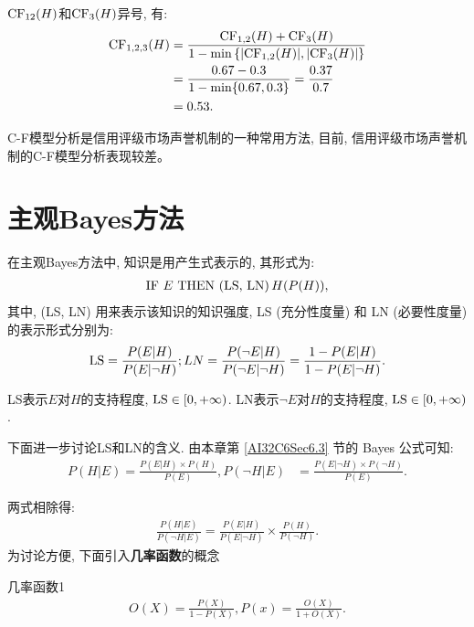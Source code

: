 $\textup{CF}_{12}(H)$和$\textup{CF}_3(H)$异号, 有:
\begin{align}
  \begin{aligned}
  \textup{CF}_{1,2,3}(H) &=\frac{\textup{CF}_{1,2}(H)+\textup{CF}_{3}(H)}{1-\min \left\{| \textup{CF}_{1,2}(H)|,| \textup{CF}_{3}(H)|\right\}} \\
                 &=\frac{0.67-0.3}{1-\min\{0.67,0.3\}}=\frac{0.37}{0.7} \\
                 &=0.53.
  \end{aligned}
\end{align}

\begin{remark}
    C-F模型分析是信用评级市场声誉机制的一种常用方法, 目前, 信用评级市场声誉机制的C-F模型分析表现较差。
\end{remark}
\section{主观Bayes方法}
在主观Bayes方法中, 知识是用产生式表示的, 其形式为:
\begin{align}
   \textup{IF} \,\, E\,\,  \textup{THEN}\,\,  \textup{(LS, LN)}\, H(P(H)),
\end{align}
其中, \textup{(LS, LN)} 用来表示该知识的知识强度, \textup{LS} (充分性度量) 和 \textup{LN} (必要性度量) 的表示形式分别为:
\begin{align}
\begin{aligned}
    \textup{LS} =\frac{P(E | H)}{P(E | \neg H)}; LN =\frac{P(\neg E | H)}{P(\neg E | \neg H)}=\frac{1-P(E | H)}{1-P(E | \neg H)}.
\end{aligned}
\end{align}
\begin{remark}
   \textup{LS}表示$E$对$H$的支持程度, $\textup{LS}\in [0,+\infty)$. \textup{LN}表示$\neg E$对$H$的支持程度, $\textup{LS}\in [0,+\infty)$.
\end{remark}
下面进一步讨论LS和LN的含义. 由本章第 \ref{AI32C6Sec6.3} 节的 Bayes 公式可知:
\begin{align}\label{AI32C6eq6.27}
    P(H | E) =\frac{P(E | H) \times P(H)}{P(E)},  P(\neg H | E) &=\frac{P(E | \neg H) \times P(\neg H)}{P(E)}.
\end{align}

两式相除得:
\begin{align}\label{AI32C6eq6.28}
    \frac{P(H | E)}{P(\neg H | E)}=\frac{P(E | H)}{P(E | \neg H)} \times \frac{P(H)}{P(\neg H)}.
\end{align}
为讨论方便, 下面引入\textbf{几率函数}的概念
\begin{mydef}{几率函数}{1}
\begin{align}\label{AI32C6eq6.30}
    O(X)=\frac{P(X)}{1-P(X)}, P(x)=\frac{O(X)}{1+O( X)}.
\end{align}
\end{mydef}

